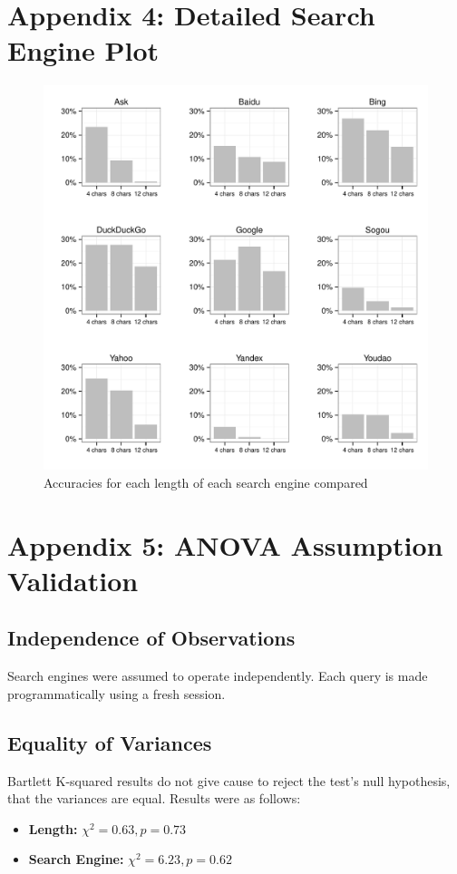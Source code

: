 \documentclass{csfourzero}
\begin{document}
\pagebreak
\section{Appendix 4: Detailed Search Engine Plot}
\begin{figure}[H]
  \centerline{\includegraphics[width=\textwidth]{eng_vs_acc_9_way}}
  \caption{Accuracies for each length of each search engine compared}\label{fig:9searchengines}
\end{figure}

\pagebreak
\section{Appendix 5: ANOVA Assumption Validation}
\subsection{Independence of Observations}
Search engines were assumed to operate independently. Each query is made programmatically using a fresh session.

\subsection{Equality of Variances}
Bartlett K-squared results do not give cause to reject the test's null hypothesis, that the variances are equal. Results were as follows:
\begin{itemize}
  \item{\textbf{Length:} $\chi^2 = 0.63, p = 0.73 $}
  \item{\textbf{Search Engine:} $\chi^2 = 6.23, p = 0.62 $}
\end{itemize}
\end{document}
